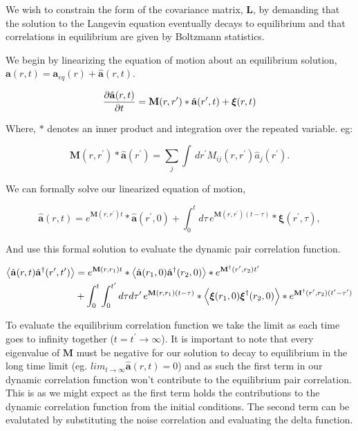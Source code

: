 We wish to constrain the form of the covariance matrix, $\mathbf{L}$, by
demanding that the solution to the Langevin equation eventually decays to
equilibrium and that correlations in equilibrium are given by Boltzmann
statistics.

We begin by linearizing the equation of motion about an equilibrium solution,
$\mathbf{a}(r, t) = \mathbf{a}_{eq}(r) + \hat{\mathbf{a}}(r, t)$.

\begin{equation} \frac{\partial \hat{\mathbf{a}} (r, t)}{\partial t} =
\mathbf{M}(r, r^\prime) \ast \hat{\mathbf{a}}(r^\prime, t) +
\boldsymbol{\xi}(r, t) \end{equation}

Where, $\ast$ denotes an inner product and integration over the repeated
variable. eg:

\begin{equation} \mathbf{M}(r, r^\prime)\ast \hat{\mathbf{a}}(r^\prime) =
\sum_j \int\,dr^\prime M_{ij}(r, r^\prime) \hat{a}_j(r^\prime).  \end{equation}

We can formally solve our linearized equation of motion,

\begin{equation} \hat{\mathbf{a}}(r, t) = e^{\mathbf{M}(r,
r^\prime)t}\ast\hat{\mathbf{a}}(r^\prime, 0) + \int_0^t d\tau\,
e^{\mathbf{M}(r, r^\prime)(t-\tau)} \ast \boldsymbol{\xi} (r^\prime, \tau),
\end{equation}

And use this formal solution to evaluate the dynamic pair correlation function.

\begin{align} \left\langle \hat{\mathbf{a}}(r,
    t)\hat{\mathbf{a}}^\dagger(r^\prime, t^\prime) \right\rangle &=
    e^{\mathbf{M}(r, r_1)t}\ast\left\langle \hat{\mathbf{a}}(r_1,
    0)\hat{\mathbf{a}}^\dagger(r_2, 0) \right\rangle \ast
    e^{\mathbf{M}^\dagger(r^\prime, r_2)t^\prime} \nonumber \\ &+ \int_0^t
\int_0^{t^\prime}d\tau d\tau^\prime\, e^{\mathbf{M}(r,
r_1)(t-\tau)}\ast\left\langle \boldsymbol{\xi}(r_1,
0)\boldsymbol{\xi}^\dagger(r_2, 0) \right\rangle \ast
e^{\mathbf{M}^\dagger(r^\prime, r_2)(t^\prime-\tau^\prime)} \end{align}

To evaluate the equilibrium correlation function we take the limit as each time
goes to infinity together ($t = t^\prime \rightarrow \infty$). It is important
to note that every eigenvalue of $\mathbf{M}$ must be negative for our solution
to decay to equilibrium in the long time limit (eg.
$lim_{t\rightarrow\infty}\hat{\mathbf{a}}(r, t) = 0$) and as such the first
term in our dynamic correlation function won't contribute to the equilibrium
pair correlation. This is as we might expect as the first term holds the
contributions to the dynamic correlation function from the initial conditions.
The second term can be evalutated by substituting the noise correlation and
evaluating the delta function.

